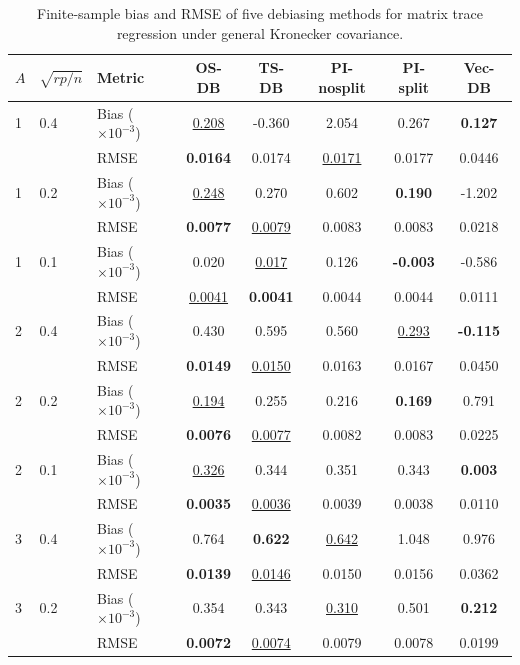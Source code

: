 \begin{table}[!htbp]
\centering
\caption{Finite-sample bias and RMSE of five debiasing methods for matrix trace regression under general Kronecker covariance.}
\label{tab:five-methods-general}
\scriptsize
\begin{threeparttable}
\setlength{\tabcolsep}{4pt}
\begin{tabular}{lllccccc}
\toprule
$A$ & $\sqrt{rp/n}$ & Metric & OS-DB & TS-DB & PI-nosplit & PI-split & Vec-DB \\
\midrule
1 & 0.4 & Bias ($\times 10^{-3}$) & \underline{0.208} & -0.360 & 2.054 & 0.267 & \textbf{0.127} \\
 &  & RMSE & \textbf{0.0164} & 0.0174 & \underline{0.0171} & 0.0177 & 0.0446 \\
1 & 0.2 & Bias ($\times 10^{-3}$) & \underline{0.248} & 0.270 & 0.602 & \textbf{0.190} & -1.202 \\
 &  & RMSE & \textbf{0.0077} & \underline{0.0079} & 0.0083 & 0.0083 & 0.0218 \\
1 & 0.1 & Bias ($\times 10^{-3}$) & 0.020 & \underline{0.017} & 0.126 & \textbf{-0.003} & -0.586 \\
 &  & RMSE & \underline{0.0041} & \textbf{0.0041} & 0.0044 & 0.0044 & 0.0111 \\
\midrule
2 & 0.4 & Bias ($\times 10^{-3}$) & 0.430 & 0.595 & 0.560 & \underline{0.293} & \textbf{-0.115} \\
 &  & RMSE & \textbf{0.0149} & \underline{0.0150} & 0.0163 & 0.0167 & 0.0450 \\
2 & 0.2 & Bias ($\times 10^{-3}$) & \underline{0.194} & 0.255 & 0.216 & \textbf{0.169} & 0.791 \\
 &  & RMSE & \textbf{0.0076} & \underline{0.0077} & 0.0082 & 0.0083 & 0.0225 \\
2 & 0.1 & Bias ($\times 10^{-3}$) & \underline{0.326} & 0.344 & 0.351 & 0.343 & \textbf{0.003} \\
 &  & RMSE & \textbf{0.0035} & \underline{0.0036} & 0.0039 & 0.0038 & 0.0110 \\
\midrule
3 & 0.4 & Bias ($\times 10^{-3}$) & 0.764 & \textbf{0.622} & \underline{0.642} & 1.048 & 0.976 \\
 &  & RMSE & \textbf{0.0139} & \underline{0.0146} & 0.0150 & 0.0156 & 0.0362 \\
3 & 0.2 & Bias ($\times 10^{-3}$) & 0.354 & 0.343 & \underline{0.310} & 0.501 & \textbf{0.212} \\
 &  & RMSE & \textbf{0.0072} & \underline{0.0074} & 0.0079 & 0.0078 & 0.0199 \\

\end{tabular}
\end{threeparttable}
\end{table}

